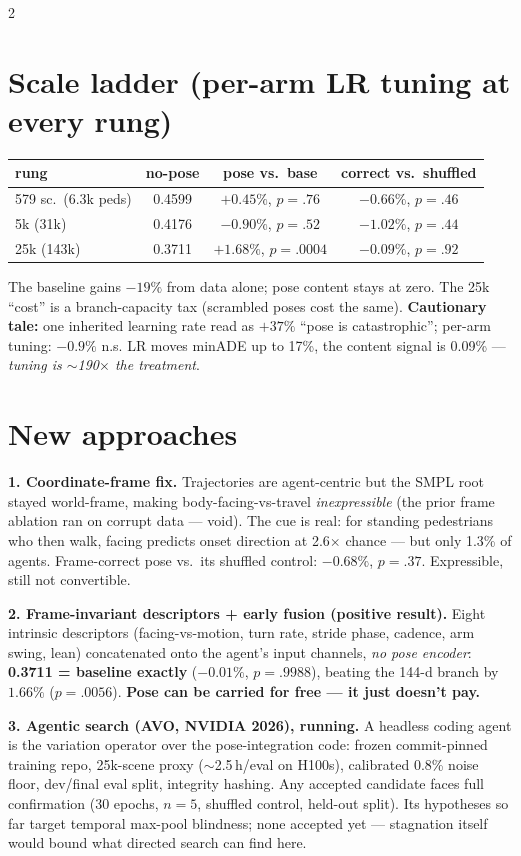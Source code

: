 \documentclass[9pt,a4paper]{extarticle}
\begin{document}
\begin{multicols}{2}
\section{Scale ladder (per-arm LR tuning at every rung)}
\begin{center}\footnotesize
\begin{tabular}{lccc}
\toprule
rung & no-pose & pose vs.\ base & correct vs.\ shuffled \\
\midrule
579 sc.\ (6.3k peds) & 0.4599 & $+0.45\%$, $p{=}.76$ & $-0.66\%$, $p{=}.46$ \\
5k (31k) & 0.4176 & $-0.90\%$, $p{=}.52$ & $-1.02\%$, $p{=}.44$ \\
25k (143k) & 0.3711 & $+1.68\%$, $p{=}.0004$ & $\mathbf{-0.09\%}$, $p{=}.92$ \\
\bottomrule
\end{tabular}
\end{center}
The baseline gains \textcolor{good}{$-19\%$} from data alone; pose content stays at zero. The 25k ``cost'' is a branch-capacity tax (scrambled poses cost the same). \textbf{Cautionary tale:} one inherited learning rate read as \textcolor{bad}{$+37\%$ ``pose is catastrophic''}; per-arm tuning: $-0.9\%$ n.s. LR moves minADE up to 17\%, the content signal is 0.09\% --- \emph{tuning is $\sim$190$\times$ the treatment}.

\section{New approaches}
\textbf{1. Coordinate-frame fix.} Trajectories are agent-centric but the SMPL root stayed world-frame, making body-facing-vs-travel \emph{inexpressible} (the prior frame ablation ran on corrupt data --- void). The cue is real: for standing pedestrians who then walk, facing predicts onset direction at 2.6$\times$ chance --- but only 1.3\% of agents. Frame-correct pose vs.\ its shuffled control: $-0.68\%$, $p{=}.37$. Expressible, still not convertible.

\textbf{2. Frame-invariant descriptors + early fusion (positive result).} Eight intrinsic descriptors (facing-vs-motion, turn rate, stride phase, cadence, arm swing, lean) concatenated onto the agent's input channels, \emph{no pose encoder}: \textbf{0.3711 = baseline exactly} ($-0.01\%$, $p{=}.9988$), beating the 144-d branch by \textcolor{good}{$1.66\%$ ($p{=}.0056$)}. \textbf{Pose can be carried for free --- it just doesn't pay.}

\textbf{3. Agentic search (AVO, NVIDIA 2026), running.} A headless coding agent is the variation operator over the pose-integration code: frozen commit-pinned training repo, 25k-scene proxy ($\sim$2.5\,h/eval on H100s), calibrated 0.8\% noise floor, dev/final eval split, integrity hashing. Any accepted candidate faces full confirmation (30 epochs, $n{=}5$, shuffled control, held-out split). Its hypotheses so far target temporal max-pool blindness; none accepted yet --- stagnation itself would bound what directed search can find here.


\end{multicols}
\end{document}
